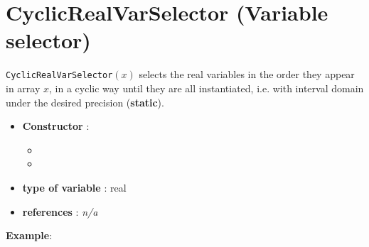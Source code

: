 \section{CyclicRealVarSelector (Variable selector)}\label{cyclicrealvarselector:cyclicrealvarselectorvarselector}\hypertarget{cyclicrealvarselector:cyclicrealvarselectorvarselector}{}
\begin{notedef}
  \texttt{CyclicRealVarSelector}$(x)$ selects the real variables in the order they appear in array $x$, in a cyclic way until they are all instantiated, i.e. with interval domain under the desired precision (\textbf{static}).
\end{notedef}

\begin{itemize}
	\item \textbf{Constructor} : 
	\begin{itemize}
	\item {}
	\item {}
	\end{itemize}	
	\item \textbf{type of variable} : real
	\item \textbf{references} : \emph{n/a}
\end{itemize}

\textbf{Example}:
%

